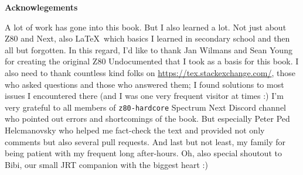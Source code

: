 \begingroup

	\textbf{Acknowlegements}

	A lot of work has gone into this book. But I also learned a lot. Not just about Z80 and Next, also \LaTeX~which basics I learned in secondary school and then all but forgotten. In this regard, I'd like to thank Jan Wilmans and Sean Young for creating the original Z80 Undocumented that I took as a basis for this book. I also need to thank countless kind folks on \url{https://tex.stackexchange.com/}, those who asked questions and those who answered them; I found solutions to most issues I encountered there (and I was one very frequent visitor at times :) I'm very grateful to all members of {\tt z80-hardcore} Spectrum Next Discord channel who pointed out errors and shortcomings of the book. But especially Peter Ped Helcmanovsky who helped me fact-check the text and provided not only comments but also several pull requests. And last but not least, my family for being patient with my frequent long after-hours. Oh, also special shoutout to Bibi, our small JRT companion with the biggest heart :)

\endgroup
